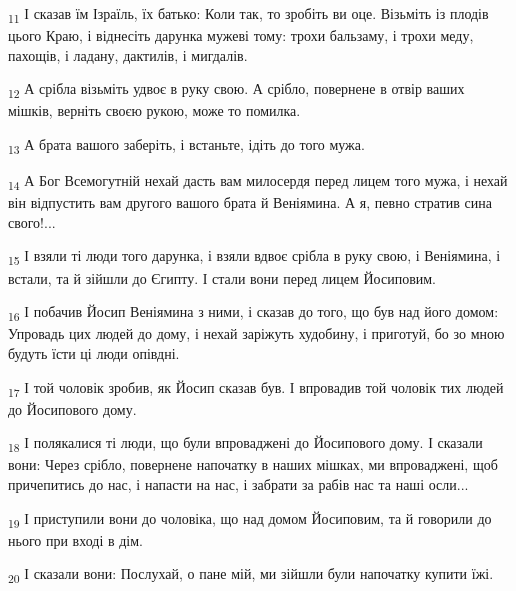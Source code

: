 \begin{tcolorbox}
\textsubscript{11} І сказав їм Ізраїль, їх батько: Коли так, то зробіть ви оце. Візьміть із плодів цього Краю, і віднесіть дарунка мужеві тому: трохи бальзаму, і трохи меду, пахощів, і ладану, дактилів, і мигдалів.
\end{tcolorbox}
\begin{tcolorbox}
\textsubscript{12} А срібла візьміть удвоє в руку свою. А срібло, повернене в отвір ваших мішків, верніть своєю рукою, може то помилка.
\end{tcolorbox}
\begin{tcolorbox}
\textsubscript{13} А брата вашого заберіть, і встаньте, ідіть до того мужа.
\end{tcolorbox}
\begin{tcolorbox}
\textsubscript{14} А Бог Всемогутній нехай дасть вам милосердя перед лицем того мужа, і нехай він відпустить вам другого вашого брата й Веніямина. А я, певно стратив сина свого!...
\end{tcolorbox}
\begin{tcolorbox}
\textsubscript{15} І взяли ті люди того дарунка, і взяли вдвоє срібла в руку свою, і Веніямина, і встали, та й зійшли до Єгипту. І стали вони перед лицем Йосиповим.
\end{tcolorbox}
\begin{tcolorbox}
\textsubscript{16} І побачив Йосип Веніямина з ними, і сказав до того, що був над його домом: Упровадь цих людей до дому, і нехай заріжуть худобину, і приготуй, бо зо мною будуть їсти ці люди опівдні.
\end{tcolorbox}
\begin{tcolorbox}
\textsubscript{17} І той чоловік зробив, як Йосип сказав був. І впровадив той чоловік тих людей до Йосипового дому.
\end{tcolorbox}
\begin{tcolorbox}
\textsubscript{18} І полякалися ті люди, що були впроваджені до Йосипового дому. І сказали вони: Через срібло, повернене напочатку в наших мішках, ми впроваджені, щоб причепитись до нас, і напасти на нас, і забрати за рабів нас та наші осли...
\end{tcolorbox}
\begin{tcolorbox}
\textsubscript{19} І приступили вони до чоловіка, що над домом Йосиповим, та й говорили до нього при вході в дім.
\end{tcolorbox}
\begin{tcolorbox}
\textsubscript{20} І сказали вони: Послухай, о пане мій, ми зійшли були напочатку купити їжі.
\end{tcolorbox}
